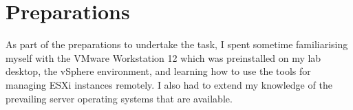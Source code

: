 \pagebreak
\section{Preparations}
As part of the preparations to undertake the task, I spent sometime familiarising myself with the VMware Workstation 12 which was preinstalled on my lab desktop, the vSphere environment, and learning how to use the tools for managing ESXi instances remotely. I also had to extend my knowledge of the prevailing server operating systems that are available.
